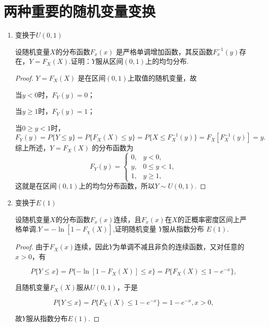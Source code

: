 \section{两种重要的随机变量变换}

\begin{enumerate}
      \item 变换于$U(0,1)$
            \begin{example}{}{}
                  设随机变量$X$的分布函数$F_x(x)$ 是严格单调增加函数，其反函数$F_x^{-1}(y)$存在，$Y=F_X(X)$.证明：$Y$服从区间$(0,1)$上的均匀分布.
            \end{example}
            \begin{proof}
                  $Y = F_{X}(X)$ 是在区间$(0,1)$上取值的随机变量，故

                  当$y<0$时，$F_{Y}(y)=0$；

                  当$y\ge 1$时，$F_{Y}(y)=1$；

                  当$0\ge y<1$时，
                  $$F_{Y}(y)=P\{Y\le y\}=P\{F_{X}(X)\le y\}=P\{X\le F_{X}^{-1}(y)\}=F_{X}[F_{X}^{-1}(y)]=y.$$
                  综上所述，$Y = F_{X}(X)$ 的分布函数为
                  $$
                        F_{Y}(y)=\begin{cases}0,&y<0,\\y,&0\le y<1,\\1,&y\ge 1,\end{cases}$$
                  这就是在区间$(0,1)$上的均匀分布函数，所以$Y\sim U(0,1)$.
            \end{proof}
      \item 变换于$E(1)$
            \begin{example}{}{}
                  设随机变量$X$的分布函数$F_x(x)$连续，且$F_x(x)$在$X$的正概率密度区间上严格单调.$Y=-\ln[1-F_{\chi}(X)]$,证明随机变量 $Y$服从指数分布 $E(1).$
            \end{example}
            \begin{proof}
                  由于$F_{X}(x)$连续，因此$Y$为单调不减且非负的连续函数，又对任意的$x>0$，有

                  $$P\{Y\leqslant x\}=P\{-\ln[1-F_{X}(X)]\leqslant x\}=P\{F_{X}(X)\leqslant 1-e^{-x}\},$$

                  且随机变量$F_{X}(X)$服从$U(0,1)$，于是

                  $$P\{Y\leqslant x\}=P\{F_{X}(X)\leqslant 1-e^{-x}\}=1-e^{-x},x>0,$$

                  故$Y$服从指数分布$E(1)$.
            \end{proof}
\end{enumerate}